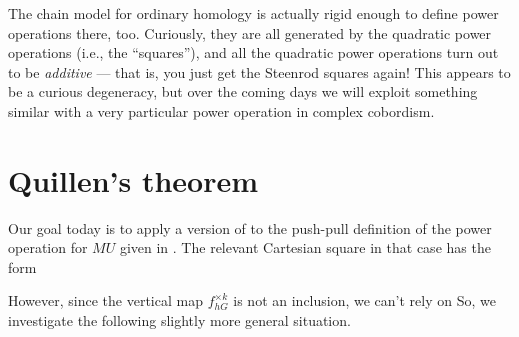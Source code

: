 \begin{remark}
The chain model for ordinary homology is actually rigid enough to define power operations there, too.  Curiously, they are all generated by the quadratic power operations (i.e., the ``squares''), and all the quadratic power operations turn out to be \emph{additive} --- that is, you just get the Steenrod squares again!  This appears to be a curious degeneracy, but over the coming days we will exploit something similar with a very particular power operation in complex cobordism.
\end{remark}









\section{Quillen's theorem}


Our goal today is to apply a version of  to the push-pull definition of the power operation for $MU$ given in .  The relevant Cartesian square in that case has the form
\begin{center}
\end{center}
However, since the vertical map $f^{\times k}_{hG}$ is not an inclusion, we can't rely on   So, we investigate the following slightly more general situation.

